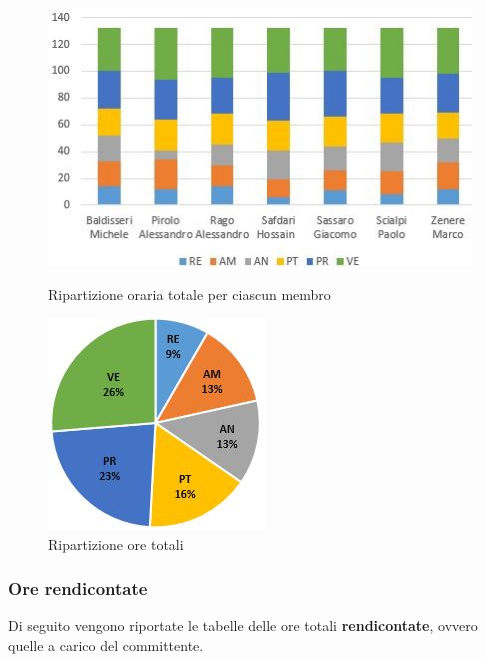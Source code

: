 \begin{figure}[!htb]
   \begin{minipage}{0.6\textwidth}
     \centering
     \includegraphics{Images/PO-OreTotali}
     \caption{Ripartizione oraria totale per ciascun membro}
   \end{minipage}\hspace{0.1\textwidth}
   \begin{minipage}{0.3\textwidth}
     \centering
     \includegraphics[width=.9\textwidth]{Images/PE-OreTotali}
     \captionsetup{width=.9\textwidth}
     \caption{Ripartizione ore totali}
   \end{minipage}
\end{figure}

\subsubsection{Ore rendicontate}
Di seguito vengono riportate le tabelle delle ore totali \textbf{rendicontate}, ovvero quelle a carico del committente.

